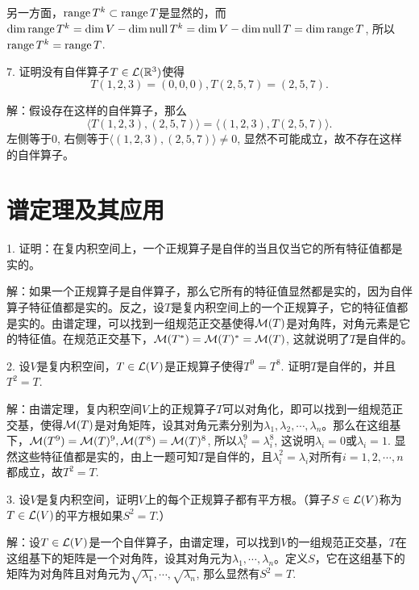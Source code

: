 \documentclass[hyperref,]{ctexart}
\begin{document}
另一方面，\(\mathrm{range}\, T^k\subset \mathrm{range}\, T\)是显然的，而\(\mathrm{dim}\,\mathrm{range}\, T^k=\mathrm{dim}\, V-\mathrm{dim}\, \mathrm{null}\, T^k=\mathrm{dim}\, V-\mathrm{dim}\, \mathrm{null}\, T=\mathrm{dim}\,\mathrm{range}\, T\),
所以\(\mathrm{range}\, T^k=\mathrm{range}\, T\).

\bigskip

\noindent{} 7. 证明没有自伴算子\(T\in\mathcal{L}(\mathbb{R}^3)\)使得
\[T(1,2,3)=(0,0,0),T(2,5,7)=(2,5,7).\]

\smallskip

\noindent{} 解：假设存在这样的自伴算子，那么
\[\langle T(1,2,3),(2,5,7)\rangle =\langle (1,2,3),T(2,5,7)\rangle.\]
左侧等于\(0\), 右侧等于\(\langle (1,2,3),(2,5,7)\rangle \ne0\),
显然不可能成立，故不存在这样的自伴算子。

\bigskip

\section{谱定理及其应用}\label{ux8c31ux5b9aux7406ux53caux5176ux5e94ux7528}

\noindent{} 1.
证明：在复内积空间上，一个正规算子是自伴的当且仅当它的所有特征值都是实的。

\smallskip

\noindent{}
解：如果一个正规算子是自伴算子，那么它所有的特征值显然都是实的，因为自伴算子特征值都是实的。反之，设\(T\)是复内积空间上的一个正规算子，它的特征值都是实的。由谱定理，可以找到一组规范正交基使得\(\mathcal{M}(T)\)是对角阵，对角元素是它的特征值。在规范正交基下，\(\mathcal{M}(T^*)=\mathcal{M}(T)^*=\mathcal{M}(T)\),
这就说明了\(T\)是自伴的。

\bigskip

\noindent{} 2.
设\(V\)是复内积空间，\(T\in\mathcal{L}(V)\)是正规算子使得\(T^9=T^8\).
证明\(T\)是自伴的，并且\(T^2=T\).

\smallskip

\noindent{}
解：由谱定理，复内积空间\(V\)上的正规算子\(T\)可以对角化，即可以找到一组规范正交基，使得\(\mathcal{M}(T)\)是对角矩阵，设其对角元素分别为\(\lambda_1,\lambda_2,\cdots,\lambda_n\)。那么在这组基下，\(\mathcal{M}(T^9)=\mathcal{M}(T)^9,\mathcal{M}(T^8)=\mathcal{M}(T)^8\),
所以\(\lambda_i^9=\lambda_i^8\), 这说明\(\lambda_i=0\)或\(\lambda_i=1\).
显然这些特征值都是实的，由上一题可知\(T\)是自伴的，且\(\lambda_i^2=\lambda_i\)对所有\(i=1,2,\cdots,n\)都成立，故\(T^2=T\).

\bigskip

\noindent{} 3.
设\(V\)是复内积空间，证明\(V\)上的每个正规算子都有平方根。（算子\(S\in\mathcal{L}(V)\)称为\(T\in\mathcal{L}(V)\)的平方根如果\(S^2=T\).）

\smallskip

\noindent{}
解：设\(T\in\mathcal{L}(V)\)是一个自伴算子，由谱定理，可以找到\(V\)的一组规范正交基，\(T\)在这组基下的矩阵是一个对角阵，设其对角元为\(\lambda_1,\cdots,\lambda_n\)。定义\(S\)，它在这组基下的矩阵为对角阵且对角元为\(\sqrt{\lambda_1},\cdots,\sqrt{\lambda_n}\),
那么显然有\(S^2=T\).
\end{document}
